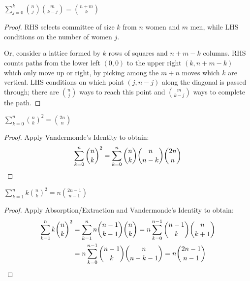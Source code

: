 \documentclass[a4paper]{article}
\begin{document}
\begin{theorem}
$\displaystyle \sum_{j=0}^k\binom nj\binom m{k-j}=\binom{n+m}k$

\begin{hl}
\begin{proof}
RHS selects committee of size $k$ from $n$ women and $m$ men, while LHS conditions on the number of women $j$.

\medskip

Or, consider a lattice formed by $k$ rows of squares and $n+m-k$ columns. RHS counts paths from the lower left $(0,0)$ to the upper right $(k,n+m-k)$ which only move up or right, by picking among the $m+n$ moves which $k$ are vertical. LHS conditions on which point $(j,n-j)$ along the diagonal is passed through; there are $\binom nj$ ways to reach this point and $\binom m{k-j}$ ways to complete the path.
\end{proof}
\end{hl}
\end{theorem}

\begin{theorem}
$\displaystyle\sum_{k=0}^n\binom nk^2=\binom{2n}n$

\begin{hl}
\begin{proof}
Apply Vandermonde's Identity to obtain:
\begin{equation*}
\sum_{k=0}^n\binom nk^2
=\sum_{k=0}^n\binom nk\binom n{n-k}
\binom{2n}n\qedhere
\end{equation*}
\end{proof}
\end{hl}
\end{theorem}

\begin{theorem}
$\displaystyle\sum_{k=1}^nk\binom nk^2=n\binom{2n-1}{n-1}$

\begin{hl}
\begin{proof}
Apply Absorption/Extraction and Vandermonde's Identity to obtain:
\begin{align*}
\sum_{k=1}^nk\binom nk^2
&=\sum_{k=1}^nn\binom{n-1}{k-1}\binom nk
=n\sum_{k=0}^{n-1}\binom{n-1}{k}\binom n{k+1}\\
&=n\sum_{k=0}^{n-1}\binom{n-1}{k}\binom n{n-k-1}
=n\binom{2n-1}{n-1}\qedhere
\end{align*}
\end{proof}
\end{hl}
\end{theorem}
\end{document}
